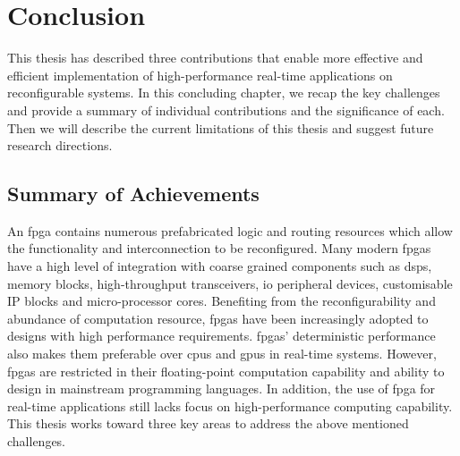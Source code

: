 
\chapter{Conclusion}

\label{ch:conclusion}

This thesis has described three contributions that enable more effective and efficient implementation of high-performance real-time applications on reconfigurable systems.
In this concluding chapter, we recap the key challenges and provide a summary of individual contributions and the significance of each.
Then we will describe the current limitations of this thesis and suggest future research directions.

\section{Summary of Achievements}

An \gls{fpga} contains numerous prefabricated logic and routing resources which allow the functionality and interconnection to be reconfigured.
Many modern \glspl{fpga} have a high level of integration with coarse grained components such as \glspl{dsp}, memory blocks, high-throughput transceivers, \gls{io} peripheral devices, customisable IP blocks and micro-processor cores.
Benefiting from the reconfigurability and abundance of computation resource, \glspl{fpga} have been increasingly adopted to designs with high performance requirements.
\glspl{fpga}' deterministic performance also makes them preferable over \glspl{cpu} and \glspl{gpu} in real-time systems.
However, \glspl{fpga} are restricted in their floating-point computation capability and ability to design in mainstream programming languages.
In addition, the use of \gls{fpga} for real-time applications still lacks focus on high-performance computing capability.
This thesis works toward three key areas to address the above mentioned challenges.

